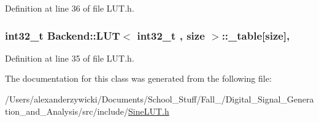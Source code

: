 Definition at line 36 of file L\+U\+T.\+h.

\hypertarget{class_backend_1_1_l_u_t_ae70f3f0c9aaa9e0b85517d8e2c61d9a5}{
\subsubsection[{\+\_\+table}]{\setlength{\rightskip}{0pt plus 5cm}int32\+\_\+t  {\bf Backend\+::\+L\+U\+T}$<$ int32\+\_\+t , size $>$\+::\+\_\+table\mbox{[}size\mbox{]}\hspace{0.3cm}{\ttfamily [protected]}, {\ttfamily [inherited]}}}\label{class_backend_1_1_l_u_t_ae70f3f0c9aaa9e0b85517d8e2c61d9a5}


Definition at line 35 of file L\+U\+T.\+h.



The documentation for this class was generated from the following file\+:\begin{DoxyCompactItemize}
\item 
/\+Users/alexanderzywicki/\+Documents/\+School\+\_\+\+Stuff/\+Fall\+\_/\+Digital\+\_\+\+Signal\+\_\+\+Generation\+\_\+and\+\_\+\+Analysis/src/include/\hyperlink{_sine_l_u_t_8h}{Sine\+L\+U\+T.\+h}\end{DoxyCompactItemize}
